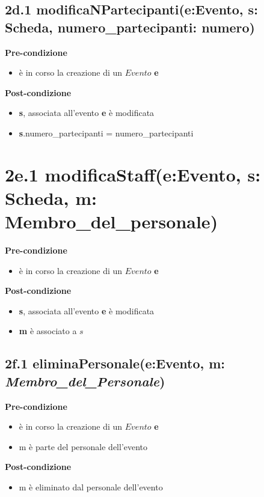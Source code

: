 \documentclass[12pt]{extarticle}
\begin{document}
\subsection*{2d.1 modificaNPartecipanti(e:Evento, s: Scheda, numero\_partecipanti: numero)}

\textbf{Pre-condizione}
\begin{itemize}
  \item è in corso la creazione di un $Evento$ \textbf{e}
\end{itemize} 
\textbf{Post-condizione}
\begin{itemize}
  \item \textbf{s}, associata all'evento \textbf{e} è modificata
  \item \textbf{s}.numero\_partecipanti = numero\_partecipanti
\end{itemize} 

\section*{2e.1 modificaStaff(e:Evento, s: Scheda, m: Membro\_del\_personale)}

\textbf{Pre-condizione}
\begin{itemize}
  \item è in corso la creazione di un $Evento$ \textbf{e}
\end{itemize}
\textbf{Post-condizione}
\begin{itemize}
  \item \textbf{s}, associata all'evento \textbf{e} è modificata
  \item \textbf{m} è associato a $s$
\end{itemize}

\subsection*{2f.1 eliminaPersonale(e:Evento, m: \textit{Membro\_del\_Personale})}

\textbf{Pre-condizione}
\begin{itemize}
  \item è in corso la creazione di un $Evento$ \textbf{e}
  \item m è parte del personale dell'evento
\end{itemize}
\textbf{Post-condizione}
\begin{itemize}
  \item m è eliminato dal personale dell'evento
\end{itemize}
\end{document}
